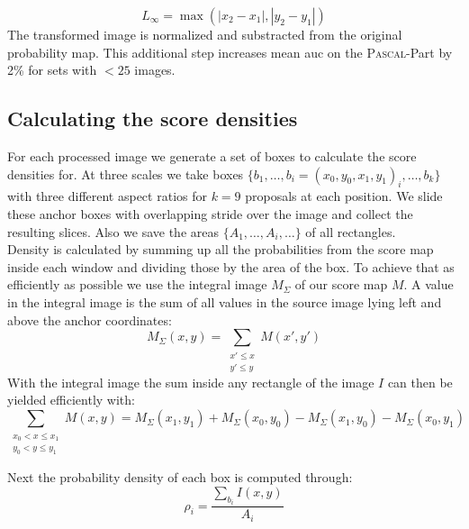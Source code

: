 \begin{equation}
    L_\infty = \max(|x_2 - x_1|, |y_2 - y_1|)
\end{equation}
The transformed image is normalized and substracted from the original probability map. This additional step increases mean \gls{auc} on the \textsc{Pascal}-Part by 2\% for sets with $< 25$ images.

\clearpage
\subsection{Calculating the score densities}
\label{sec:pipeline:eval:density}
For each processed image we generate a set of boxes to calculate the score densities for. At three scales we take boxes $\{b_1,\dotsc, b_i = (x_0, y_0, x_1, y_1)_i,\dotsc, b_k\}$ with three different aspect ratios for $k=9$ \citep{ren_faster_2015} proposals at each position. We slide these anchor boxes  with overlapping stride over the image and collect the resulting slices. Also we save the areas $\{A_1,\dotsc, A_i,\dotsc\}$ of all rectangles.\\
Density is calculated by summing up all the probabilities from the score map inside each window and dividing those by the area of the box. To achieve that as efficiently as possible we use the integral image $M_\Sigma$ of our score map $M$. A value in the integral image is the sum of all values in the source image lying left and above the anchor coordinates:
\begin{equation}
    M_\Sigma(x, y) = \sum_{\substack{x' \le x\\ y' \le y}} M(x', y')
\end{equation}
With the integral image the sum inside any rectangle of the image $I$ can then be yielded efficiently with:
\begin{equation}
    \sum_{\substack{x_0 < x \le x_1\\ y_0 < y \le y_1}}M(x,y) = M_\Sigma(x_1, y_1) + M_\Sigma(x_0, y_0) - M_\Sigma(x_1, y_0) - M_\Sigma(x_0, y_1)
\end{equation}

Next the probability density of each box is computed through:
\begin{equation}
    \rho_i = \frac{\sum_{b_i}I(x,y)}{A_i}
\end{equation}

\clearpage
